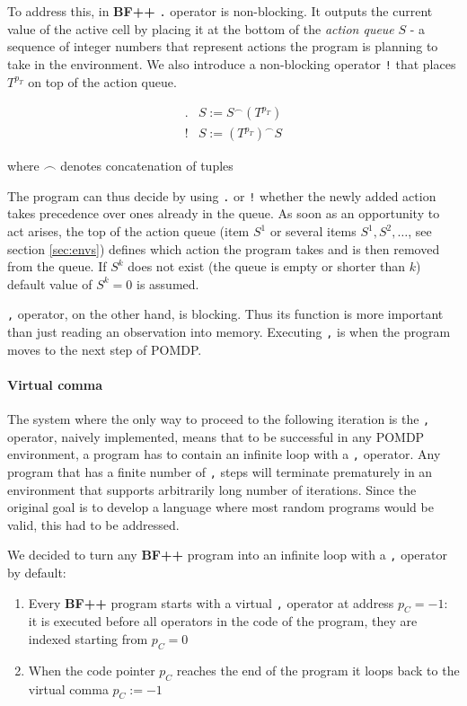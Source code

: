 To address this, in \textbf{BF++} \texttt{.} operator is non-blocking.
It outputs the current value of the active cell by placing it at the bottom of the \textit{action queue} $S$ - a sequence of integer numbers that represent actions the program is planning to take in the environment. We also introduce a non-blocking operator \texttt{!} that places $T^{p_T}$ on top of the action queue.

\begin{equation}
    \begin{array}{cc}
         . & S := S^\frown (T^{p_T}) \\
         ! & S := (T^{p_T})^\frown S
    \end{array}
\end{equation}

where $\frown$ denotes concatenation of tuples

The program can thus decide by using \texttt{.} or \texttt{!} whether the newly added action takes precedence over ones already in the queue.
As soon as an opportunity to act arises, the top of the action queue (item $S^1$ or several items $S^1,S^2,\dots$, see section \ref{sec:envs}) defines which action the program takes and is then removed from the queue. 
If $S^k$ does not exist (the queue is empty or shorter than $k$) default value of $S^k=0$ is assumed.

\texttt{,} operator, on the other hand, is blocking. 
Thus its function is more important than just reading an observation into memory.
Executing \texttt{,} is when the program moves to the next step of POMDP.

\paragraph{Virtual comma}
\label{sec:virtualcomma}


The system where the only way to proceed to the following iteration is the \texttt{,} operator, naively implemented, means that to be successful in any POMDP environment, a program has to contain an infinite loop with a \texttt{,} operator.
Any program that has a finite number of \texttt{,} steps will terminate prematurely in an environment that supports arbitrarily long number of iterations.
Since the original goal is to develop a language where most random programs would be valid, this had to be addressed.

We decided to turn any \textbf{BF++} program into an infinite loop with a \texttt{,} operator by default:
\begin{enumerate}
    \item Every \textbf{BF++} program starts with a virtual \texttt{,} operator at address $p_C = -1$: it is executed before all operators in the code of the program, they are indexed starting from $p_C = 0$
    \item When the code pointer $p_C$ reaches the end of the program it loops back to the virtual comma $p_C := -1$
\end{enumerate}

